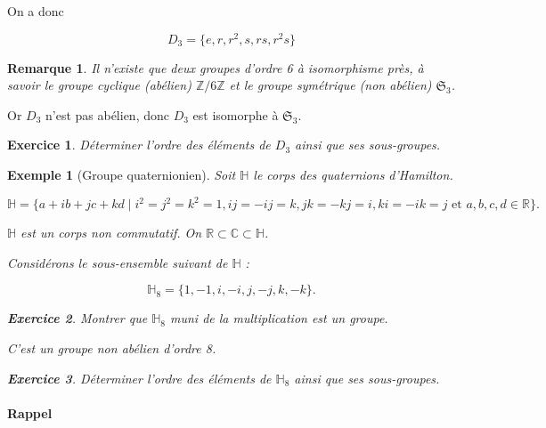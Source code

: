 \documentclass[french]{book}
\newtheorem*{remark}{Remarque}
\newtheorem{exo}{Exercice}
\newtheorem{exemple}{Exemple}
\begin{document}
On a donc

\[
D_3 = \{ e, r, r ^2, s, rs, r ^2 s \}
\]

\begin{remark}
  Il n'existe que deux groupes d'ordre 6 à isomorphisme près, à savoir le groupe cyclique (abélien) $\mathbb{Z}/{ 6 }\mathbb{Z}$ et le groupe symétrique (non abélien) $\mathfrak{S}_{3} $.
\end{remark}

Or $D_3$ n'est pas abélien, donc $D_3$ est isomorphe à $\mathfrak{S}_{3} $.

\begin{exo}
  Déterminer l'ordre des éléments de $D_3$ ainsi que ses sous-groupes.
\end{exo}


\begin{exemple}[Groupe quaternionien]
  Soit $\mathbb{H}$ le corps des quaternions d'Hamilton.

  \[
  \mathbb{H} = \{ a+ib+jc+kd \mid i ^2 = j ^2 = k ^2 = 1, ij = -ij = k, jk=-kj=i, ki=-ik=j \text{ et }  a, b, c, d \in \mathbb{R}\}.
  \]

  $\mathbb{H}$ est un corps non commutatif. On $\mathbb{R} \subset \mathbb{C} \subset \mathbb{H}$.

  Considérons le sous-ensemble suivant de $\mathbb{H}$ :

  \[
  \mathbb{H} _{8} = \{ 1, -1, i, -i, j, -j, k, -k \}.
  \]

  \begin{exo}
    Montrer que $\mathbb{H}_8$ muni de la multiplication est un groupe.
  \end{exo}

  C'est un groupe non abélien d'ordre 8.

  \begin{exo}
    Déterminer l'ordre des éléments de $\mathbb{H} _{8}$ ainsi que ses sous-groupes.
  \end{exo}
\end{exemple}



\paragraph{Rappel}
\end{document}
